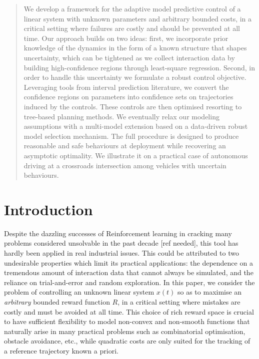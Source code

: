 \documentclass{article}
\begin{document}
\begin{abstract}
We develop a framework for the adaptive model predictive control of a linear system with unknown parameters and arbitrary bounded costs, in a critical setting where failures are costly and should be prevented at all time.  Our approach builds on two ideas: first, we incorporate prior knowledge of the dynamics in the form of a known structure that shapes uncertainty, which can be tightened as we collect interaction data by building high-confidence regions through least-square regression. Second, in order to handle this uncertainty we formulate a robust control objective. Leveraging tools from interval prediction literature, we convert the confidence regions on parameters into confidence sets on trajectories induced by the controls. These controls are then optimised resorting to tree-based planning methods. We eventually relax our modeling assumptions with a multi-model extension based on a data-driven robust model selection mechanism. The full procedure is designed to produce reasonable and safe behaviours at deployment while recovering an asymptotic optimality. We illustrate it on a practical case of autonomous driving at a crossroads intersection among vehicles with uncertain behaviours.
\end{abstract}	

\section{Introduction}

Despite the dazzling successes of Reinforcement learning in cracking many problems considered unsolvable in the past decade [ref needed], this tool has hardly been applied in real industrial issues. This could be attributed to two undesirable properties which limit its practical applications: the dependence on a tremendous amount of interaction data that cannot always be simulated, and the reliance on trial-and-error and random exploration. In this paper, we consider the problem of controlling an unknown linear system $x(t)$ so as to maximise an \emph{arbitrary} bounded reward function $R$, in a critical setting where mistakes are costly and must be avoided at all time. 
This choice of rich reward space is crucial to have sufficient flexibility to model non-convex and non-smooth functions that naturally arise in many practical problems such as combinatorial optimisation, obstacle avoidance, etc., while quadratic costs are only suited for the tracking of a reference trajectory known a priori.
\end{document}

